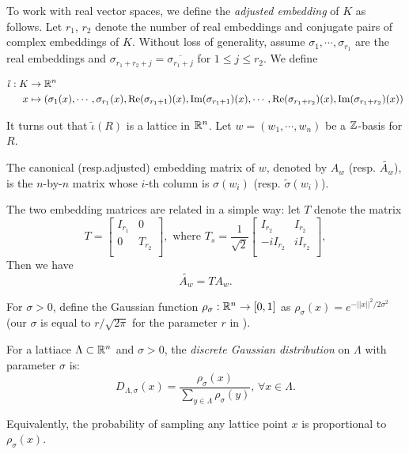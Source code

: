 \documentclass{amsart}
\begin{document}
To work with real vector spaces, we define the {\it adjusted embedding} of $K$ as follows. Let $r_1$, $r_2$ denote the number of real embeddings and conjugate pairs of complex embeddings of $K$. Without loss of generality, assume $\sigma_1, \cdots, \sigma_{r_1}$ are the real embeddings and $\sigma_{r_1+r_2+j} = \overline{\sigma_{r_1 + j}}$ for $1 \leq j \leq r_2$. We define

\begin{align*}
    \tilde{\iota}: K & \to \mathbb{R}^n \\
    x & \mapsto (\sigma_1(x), \cdots, \sigma_{r_1}(x), \Re(\sigma_{r_1+1})(x), \Im(\sigma_{r_1+1})(x), \cdots,  \Re(\sigma_{r_1+r_2})(x), \Im(\sigma_{r_1+r_2})(x))
\end{align*}

It turns out that $\tilde{\iota}(R)$ is a lattice in $\mathbb{R}^n$. Let $w = (w_1, \cdots , w_n)$ be a $\mathbb{Z}$-basis for $R$.

\begin{Definition}
The canonical (resp.adjusted) embedding matrix of $w$, denoted by $A_w$ (resp. $\tilde{A_w}$), is the $n$-by-$n$ matrix whose $i$-th column is $\sigma(w_i)$ (resp. $\tilde{\sigma}(w_i)$).
\end{Definition}

The two embedding matrices are related in a simple way:
let $T$ denote the matrix
\[
T = \begin{bmatrix}
    I_{r_1}  & 0  \\
    0     & T_{r_2} \\
\end{bmatrix},
\mbox{ where } T_s = \frac{1}{\sqrt{2}} \begin{bmatrix}
    I_{r_2}  & I_{r_2} \\
    -iI_{r_2}     & iI_{r_2} \\
\end{bmatrix},
\]
Then we have
$$\tilde{A_{w}} = T A_{w}.$$


For $\sigma > 0$, define the Gaussian function $\rho_\sigma: \mathbb{R}^n \to [0,1]$ as $\rho_\sigma(x) = e^{-||x||^2/2\sigma^2}$ (our $\sigma$ is equal to $r/\sqrt{2\pi}$ for the parameter $r$ in \cite{lyubashevsky2013ideal}).
\begin{Definition}
For a lattiace $\Lambda \subset \mathbb{R}^n$ and $\sigma > 0$, the {\it discrete Gaussian distribution} on $\Lambda$ with parameter $\sigma$ is:
\[
    D_{\Lambda, \sigma}(x) = \frac{\rho_\sigma(x)}{\sum_{y \in\Lambda} \rho_\sigma(y)}, \, \forall x \in \Lambda.
\]
\end{Definition}
Equivalently, the probability of sampling any lattice point $x$ is proportional to $\rho_\sigma(x)$.
\end{document}
